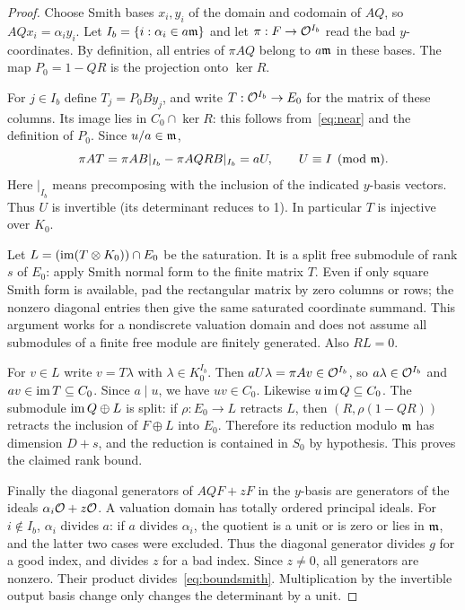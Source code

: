 \documentclass[11pt]{article}
\theoremstyle{remark}\newtheorem{remark}[theorem]{Remark}
\begin{document}
\begin{proof}
Choose Smith bases $x_i,y_i$ of the domain and codomain of $AQ$, so $AQx_i=\alpha_i y_i$. Let $I_b=\{i:\alpha_i\in a\mathfrak m\}$ and let $\pi:F\to\mathcal O^{I_b}$ read the bad $y$-coordinates. By definition, all entries of $\pi AQ$ belong to $a\mathfrak m$ in these bases. The map $P_0=1-QR$ is the projection onto $\ker R$.

For $j\in I_b$ define $T_j=P_0By_j$, and write $T:\mathcal O^{I_b}\to E_0$ for the matrix of these columns. Its image lies in $C_0\cap\ker R$: this follows from~\eqref{eq:near} and the definition of $P_0$. Since $u/a\in\mathfrak m$,
\[
 \pi AT=\pi AB|_{I_b}-\pi AQRB|_{I_b}=aU,
 \qquad U\equiv I\pmod{\mathfrak m}.
\]
Here $|_{I_b}$ means precomposing with the inclusion of the indicated $y$-basis vectors. Thus $U$ is invertible (its determinant reduces to 1). In particular $T$ is injective over $K_0$.

Let $L=(\operatorname{im}(T\otimes K_0))\cap E_0$ be the saturation. It is a split free submodule of rank $s$ of $E_0$: apply Smith normal form to the finite matrix $T$. Even if only square Smith form is available, pad the rectangular matrix by zero columns or rows; the nonzero diagonal entries then give the same saturated coordinate summand. This argument works for a nondiscrete valuation domain and does not assume all submodules of a finite free module are finitely generated. Also $RL=0$.

For $v\in L$ write $v=T\lambda$ with $\lambda\in K_0^{I_b}$. Then $aU\lambda=\pi Av\in\mathcal O^{I_b}$, so $a\lambda\in\mathcal O^{I_b}$ and $av\in\operatorname{im} T\subseteq C_0$. Since $a\mid u$, we have $uv\in C_0$. Likewise $u\operatorname{im} Q\subseteq C_0$. The submodule $\operatorname{im} Q\oplus L$ is split: if $\rho:E_0\to L$ retracts $L$, then $(R,\rho(1-QR))$ retracts the inclusion of $F\oplus L$ into $E_0$. Therefore its reduction modulo $\mathfrak m$ has dimension $D+s$, and the reduction is contained in $S_0$ by hypothesis. This proves the claimed rank bound.

Finally the diagonal generators of $AQF+zF$ in the $y$-basis are generators of the ideals $\alpha_i\mathcal O+z\mathcal O$. A valuation domain has totally ordered principal ideals. For $i\notin I_b$, $\alpha_i$ divides $a$: if $a$ divides $\alpha_i$, the quotient is a unit or is zero or lies in $\mathfrak m$, and the latter two cases were excluded. Thus the diagonal generator divides $g$ for a good index, and divides $z$ for a bad index. Since $z\ne0$, all generators are nonzero. Their product divides~\eqref{eq:boundsmith}. Multiplication by the invertible output basis change only changes the determinant by a unit.
\end{proof}
\end{document}
